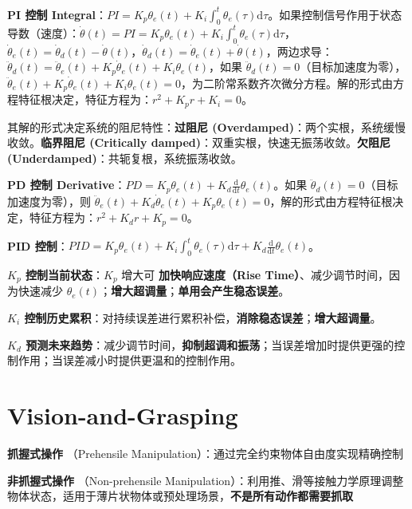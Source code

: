 \documentclass[
  8pt]{extarticle}
\begin{document}
\begin{multicols*}{4}
\textbf{PI 控制
Integral}：\(PI = K_p \theta_e(t) + K_i \int_0^t \theta_e(\tau) \mathrm{d}\tau\)。如果控制信号作用于状态导数（速度）：\(\dot{\theta}(t) = PI = K_p \theta_e(t) + K_i \int_0^t \theta_e(\tau) \mathrm{d}\tau\)，\(\dot{\theta}_e(t) = \dot{\theta}_d(t) - \dot{\theta}(t)\)，\(\dot{\theta}_d(t) = \dot{\theta}_e(t) + \dot{\theta}(t)\)，两边求导：\(\ddot{\theta}_d(t) = \ddot{\theta}_e(t) + K_p \dot{\theta}_e(t) + K_i \theta_e(t)\)，如果
\(\ddot{\theta}_d(t) = 0\)（目标加速度为零），\(\ddot{\theta}_e(t) + K_p \dot{\theta}_e(t) + K_i \theta_e(t) = 0\)，为二阶常系数齐次微分方程。解的形式由方程特征根决定，特征方程为：\(r^2 + K_p r + K_i = 0\)。

其解的形式决定系统的阻尼特性：\textbf{过阻尼
(Overdamped)}：两个实根，系统缓慢收敛。\textbf{临界阻尼 (Critically
damped)}：双重实根，快速无振荡收敛。\textbf{欠阻尼
(Underdamped)}：共轭复根，系统振荡收敛。

\textbf{PD 控制
Derivative}：\(PD = K_p \theta_e(t) + K_d \frac{\mathrm{d}}{\mathrm{d}t}\theta_e(t)\)。如果
\(\ddot{\theta}_d(t) = 0\)（目标加速度为零），则
\(\ddot{\theta}_e(t) + K_d \dot{\theta}_e(t) + K_p \theta_e(t) = 0\)，解的形式由方程特征根决定，特征方程为：\(r^2 + K_d r + K_p = 0\)。

\textbf{PID
控制}：\(PID = K_p \theta_e(t) + K_i \int_0^t \theta_e(\tau)\mathrm{d}\tau + K_d \frac{\mathrm{d}}{\mathrm{d}t}\theta_e(t)\)。

\textbf{\(K_p\) 控制当前状态}：\(K_p\) 增大可 \textbf{加快响应速度（Rise
Time）}、减少调节时间，因为快速减少
\(\theta_e(t)\)；\textbf{增大超调量}；\textbf{单用会产生稳态误差}。

\textbf{\(K_i\)
控制历史累积}：对持续误差进行累积补偿，\textbf{消除稳态误差}；\textbf{增大超调量}。

\textbf{\(K_d\)
预测未来趋势}：减少调节时间，\textbf{抑制超调和振荡}；当误差增加时提供更强的控制作用；当误差减小时提供更温和的控制作用。

\hypertarget{vision-and-grasping}{%
\section{Vision-and-Grasping}\label{vision-and-grasping}}

\textbf{抓握式操作} （Prehensile
Manipulation）：通过完全约束物体自由度实现精确控制

\textbf{非抓握式操作} （Non-prehensile
Manipulation）：利用推、滑等接触力学原理调整物体状态，适用于薄片状物体或预处理场景，\textbf{不是所有动作都需要抓取}


\end{multicols*}
\end{document}
